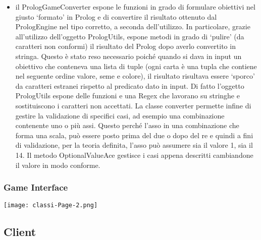 \begin{itemize}
    \item il PrologGameConverter espone le funzioni in grado di formulare obiettivi nel giusto ‘formato’ in Prolog e di convertire il risultato ottenuto dal PrologEngine nel tipo corretto, a seconda dell’utilizzo.
    In particolare, grazie all’utilizzo dell’oggetto PrologUtils, espone metodi in grado di ‘pulire’ (da caratteri non conformi) il risultato del Prolog dopo averlo convertito in stringa.
    Questo è stato reso necessario poiché quando si dava in input un obiettivo che conteneva una lista di tuple (ogni carta è una tupla che contiene nel seguente ordine valore, seme e colore), il risultato risultava essere ‘sporco’ da caratteri estranei rispetto al predicato dato in input.
    Di fatto l’oggetto PrologUtils espone delle funzioni e una Regex che lavorano su stringhe e sostituiscono i caratteri non accettati.
    La classe converter permette infine di gestire la validazione di specifici casi, ad esempio una combinazione contenente uno o più assi.
    Questo perché l’asso in una combinazione che forma una scala, può essere posto prima del due o dopo del re e quindi a fini di validazione, per la teoria definita, l’asso può assumere sia il valore 1, sia il 14.
    Il metodo OptionalValueAce gestisce i casi appena descritti cambiandone il valore in modo conforme.

\end{itemize}

\subsubsection{Game Interface}
\begin{center}
    \texttt{[image: classi-Page-2.png]} %
\end{center}

\subsection{Client}

